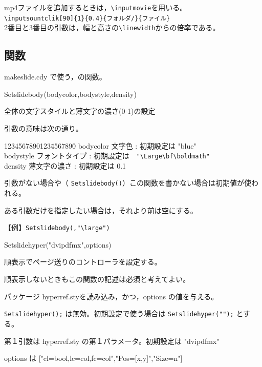 \documentclass[papersize,a4paper,12pt,uplatex]{jsarticle}
\begin{document}
mp4ファイルを追加するときは，\verb|\inputmovie|を用いる。\\
\hspace{10mm}\verb|\inputsountclik[90]{1}{0.4}{フォルダ/}{ファイル}|\\
2番目と3番目の引数は，幅と高さの\verb|\linewidth|からの倍率である。

\subsection{関数}
makeslide.cdy で使う，\ketcindy の関数。

\begin{description}

\hypertarget{setslidebody}{}
\item[関数]  Setslidebody(bodycolor,bodystyle,density)
\item[機能]  全体の文字スタイルと薄文字の濃さ(0-1)の設定
\item[説明]  引数の意味は次の通り。
\begin{tabbing}
1234567890123\=4567890\=\kill
bodycolor  \> 文字色 :  初期設定は "blue"\\
bodystyle  \> フォントタイプ :  初期設定は　\verb|"\Large\bf\boldmath"|\\
density  \> 薄文字の濃さ :  初期設定は 0.1
\end{tabbing}

引数がない場合や（ \verb|Setslidebody()|）この関数を書かない場合は初期値が使われる。

ある引数だけを指定したい場合は，それより前は空にする。

【例】\verb|Setslidebody(,"\large")|

\vspace{\baselineskip}
\hypertarget{setslidehyper}{}
\item[関数]  Setslidehyper("dvipdfmx",options)
\item[機能]  順表示でページ送りのコントローラを設定する。
\item[説明]  順表示しないときもこの関数の記述は必須と考えてよい。

パッケージ hyperref.styを読み込み，かつ，options の値を与える。

\verb|Setslidehyper();| は無効。初期設定で使う場合は \verb|Setslidehyper("");| とする。

第１引数は hyperref.sty の第１パラメータ。初期設定は "dvipdfmx"

options は ["cl=bool,lc=col,fc=col","Pos=[x,y]","Size=n"]


\end{description}
\end{document}
